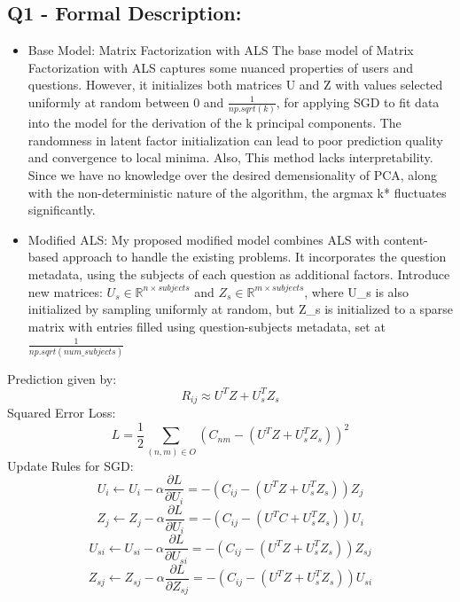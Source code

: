 \documentclass{article}
\begin{document}
\subsection*{Q1 - Formal Description:}
\begin{itemize}
    \item Base Model: Matrix Factorization with ALS\newline
    The base model of Matrix Factorization with ALS captures some nuanced properties of users and questions. \newline
    However, it initializes both matrices U and Z with values selected uniformly at random between 0 and $\frac{1}{np.sqrt(k)}$, for applying SGD to fit data into the model for the derivation of the k principal components.\newline
    The randomness in latent factor initialization can lead to poor prediction quality and convergence to local minima.\newline
    Also, This method lacks interpretability. Since we have no knowledge over the desired demensionality of PCA, along with the non-deterministic nature of the algorithm, the argmax k* fluctuates significantly. 
    \item Modified ALS:\newline
    My proposed modified model combines ALS with content-based approach to handle the existing problems.\newline
    It incorporates the question metadata, using the subjects of each question as additional factors.\newline
    Introduce new matrices: $U_s \in \mathbb{R}^{n\times subjects} $ and $Z_s \in \mathbb{R}^{m\times subjects} $, where U\_s is also initialized by sampling uniformly at random, but Z\_s is initialized to a sparse matrix with entries filled using question-subjects metadata, set at $\frac{1}{np.sqrt(num\_subjects)}$\newline

\end{itemize}
Prediction given by:
\[R_{ij} \approx U^T Z + U_s^T Z_s\]\newline
Squared Error Loss: 
\[L = \frac{1}{2} \sum_{(n,m) \in O} (C_{nm} - (U^T Z + U_s^T Z_s))^2\]
Update Rules for SGD:
\[U_i \leftarrow U_i - \alpha \frac{\partial L}{\partial U_i} = -(C_{ij} - (U^T Z + U_s^T Z_s)) Z_j\]
\[Z_j \leftarrow Z_j - \alpha \frac{\partial L}{\partial U_i} = -(C_{ij} - (U^T C + U_s^T Z_s)) U_i\]
\[U_{si} \leftarrow U_{si} - \alpha \frac{\partial L}{\partial U_{si}} = -(C_{ij} - (U^T Z + U_s^T Z_s)) Z_{sj}\]
\[Z_{sj} \leftarrow Z_{sj} - \alpha \frac{\partial L}{\partial Z_{sj}} = -(C_{ij} - (U^T Z + U_s^T Z_s)) U_{si}\]
\newpage
\end{document}
